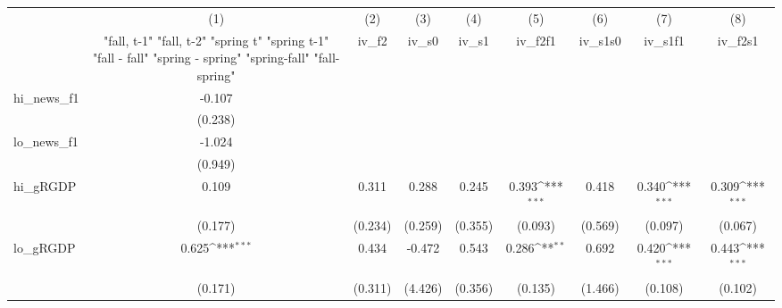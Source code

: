 {
\def\sym#1{\ifmmode^{#1}\else\(^{#1}\)\fi}
\begin{tabular}{l*{8}{c}}
\toprule
            &\multicolumn{1}{c}{(1)}&\multicolumn{1}{c}{(2)}&\multicolumn{1}{c}{(3)}&\multicolumn{1}{c}{(4)}&\multicolumn{1}{c}{(5)}&\multicolumn{1}{c}{(6)}&\multicolumn{1}{c}{(7)}&\multicolumn{1}{c}{(8)}\\
            &\multicolumn{1}{c}{  "fall, t-1" "fall, t-2" "spring t" "spring t-1"  "fall - fall" "spring - spring" "spring-fall" "fall-spring" }&\multicolumn{1}{c}{iv\_f2}&\multicolumn{1}{c}{iv\_s0}&\multicolumn{1}{c}{iv\_s1}&\multicolumn{1}{c}{iv\_f2f1}&\multicolumn{1}{c}{iv\_s1s0}&\multicolumn{1}{c}{iv\_s1f1}&\multicolumn{1}{c}{iv\_f2s1}\\
\midrule
hi\_news\_f1  &      -0.107         &                     &                     &                     &                     &                     &                     &                     \\
            &     (0.238)         &                     &                     &                     &                     &                     &                     &                     \\
\addlinespace
lo\_news\_f1  &      -1.024         &                     &                     &                     &                     &                     &                     &                     \\
            &     (0.949)         &                     &                     &                     &                     &                     &                     &                     \\
\addlinespace
hi\_gRGDP    &       0.109         &       0.311         &       0.288         &       0.245         &       0.393\sym{***}&       0.418         &       0.340\sym{***}&       0.309\sym{***}\\
            &     (0.177)         &     (0.234)         &     (0.259)         &     (0.355)         &     (0.093)         &     (0.569)         &     (0.097)         &     (0.067)         \\
\addlinespace
lo\_gRGDP    &       0.625\sym{***}&       0.434         &      -0.472         &       0.543         &       0.286\sym{**} &       0.692         &       0.420\sym{***}&       0.443\sym{***}\\
            &     (0.171)         &     (0.311)         &     (4.426)         &     (0.356)         &     (0.135)         &     (1.466)         &     (0.108)         &     (0.102)         \\

\end{tabular}}
